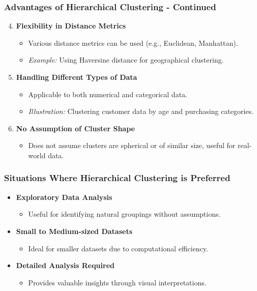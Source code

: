 \documentclass[aspectratio=169]{beamer}
\begin{document}
\begin{frame}[fragile]
    \frametitle{Advantages of Hierarchical Clustering - Continued}
    \begin{enumerate}
        \setcounter{enumi}{3} %
        \item \textbf{Flexibility in Distance Metrics}
        \begin{itemize}
            \item Various distance metrics can be used (e.g., Euclidean, Manhattan).
            \item \textit{Example:} Using Haversine distance for geographical clustering.
        \end{itemize}

        \item \textbf{Handling Different Types of Data}
        \begin{itemize}
            \item Applicable to both numerical and categorical data.
            \item \textit{Illustration:} Clustering customer data by age and purchasing categories.
        \end{itemize}

        \item \textbf{No Assumption of Cluster Shape}
        \begin{itemize}
            \item Does not assume clusters are spherical or of similar size, useful for real-world data.
        \end{itemize}
    \end{enumerate}
\end{frame}

\begin{frame}[fragile]
    \frametitle{Situations Where Hierarchical Clustering is Preferred}
    \begin{itemize}
        \item \textbf{Exploratory Data Analysis}
        \begin{itemize}
            \item Useful for identifying natural groupings without assumptions.
        \end{itemize}
        \item \textbf{Small to Medium-sized Datasets}
        \begin{itemize}
            \item Ideal for smaller datasets due to computational efficiency.
        \end{itemize}
        \item \textbf{Detailed Analysis Required}
        \begin{itemize}
            \item Provides valuable insights through visual interpretations.
        \end{itemize}
    \end{itemize}
\end{frame}
\end{document}
